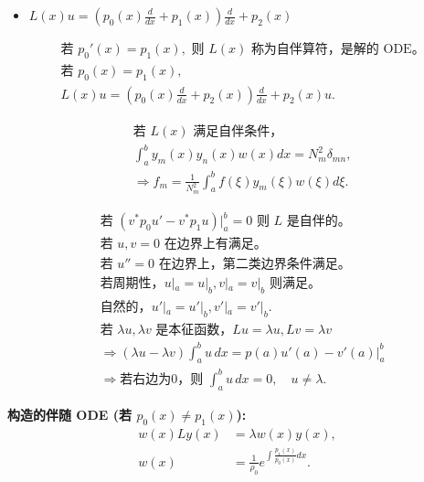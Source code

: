 \begin{itemize}
    \item $L(x)u = (p_0(x) \frac{d}{dx} + p_1(x)) \frac{d}{dx} + p_2(x)$
\end{itemize}

\begin{align*}
&\text{若 } p_0'(x) = p_1(x), \text{ 则 } L(x) \text{ 称为自伴算符，是解的 ODE。} \\
&\text{若 } p_0(x) = p_1(x), \\
&L(x)u = (p_0(x) \frac{d}{dx} + p_2(x)) \frac{d}{dx} + p_2(x)u.
\end{align*}

\begin{align*}
&\text{若 } L(x) \text{ 满足自伴条件，} \\
&\int_a^b y_m(x) y_n(x) w(x) dx = N_m^2 \delta_{mn}, \\
&\Rightarrow f_m = \frac{1}{N_m^2} \int_a^b f(\xi) y_m(\xi) w(\xi) d\xi.
\end{align*}


\begin{align*}
    &\text{若 } (v^* p_0 u' - v^* p_1 u) \Big|_a^b = 0 \text{ 则 } L \text{ 是自伴的。} \\
    &\text{若 } u, v = 0 \text{ 在边界上有满足。} \\
    &\text{若 } u'' = 0 \text{ 在边界上，第二类边界条件满足。} \\
    &\text{若周期性，} u|_a = u|_b, v|_a = v|_b \text{ 则满足。} \\
    &\text{自然的，} u'|_a = u'|_b, v'|_a = v'|_b. \\
    &\text{若 } \lambda u, \lambda v \text{ 是本征函数，} L u = \lambda u, L v = \lambda v \\
    &\Rightarrow (\lambda u - \lambda v) \int_a^b u \, dx = p(a) u'(a) - v'(a) \Big|_a^b \\
    &\Rightarrow \text{若右边为0，则 } \int_a^b u \, dx = 0, \quad u \neq \lambda.
    \end{align*}
    
    \textbf{构造的伴随 ODE (若 $p_0(x) \neq p_1(x)$):}
    \begin{align*}
    w(x) L y(x) &= \lambda w(x) y(x), \\
    w(x) &= \frac{1}{\rho_0} e^{\int \frac{p_1(x)}{p_0(x)} dx}.
    \end{align*}